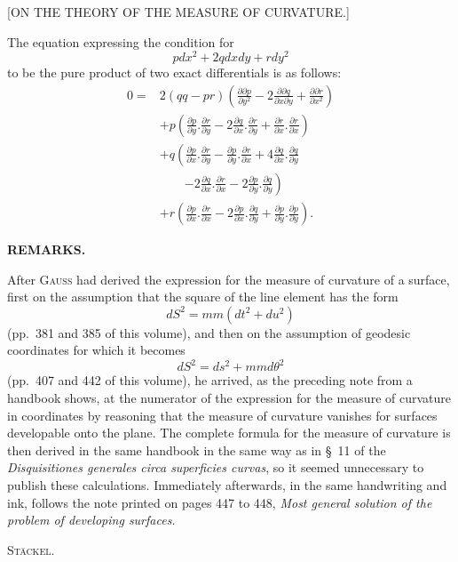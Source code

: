 \clearpage
{}
\begin{center}\large [ON THE THEORY OF THE MEASURE OF CURVATURE.]\end{center}
\noindent\hspace*{1.2em}The equation expressing the condition for
\[
pdx^2+2qdxdy+rdy^2
\]
\noindent to be the pure product of two exact differentials is as follows:
\[
\begin{aligned}
0={}&2(qq-pr)\left(\frac{\partial\partial p}{\partial y^2}
-2\frac{\partial\partial q}{\partial x\partial y}
+\frac{\partial\partial r}{\partial x^2}\right)\\
&+p\left(\frac{\partial p}{\partial y}.\frac{\partial r}{\partial y}
-2\frac{\partial q}{\partial x}.\frac{\partial r}{\partial y}
+\frac{\partial r}{\partial x}.\frac{\partial r}{\partial x}\right)\\
&+q\left(\frac{\partial p}{\partial x}.\frac{\partial r}{\partial y}
-\frac{\partial p}{\partial y}.\frac{\partial r}{\partial x}
+4\frac{\partial q}{\partial x}.\frac{\partial q}{\partial y}\right.\\
&\qquad\left.-2\frac{\partial q}{\partial x}.\frac{\partial r}{\partial x}
-2\frac{\partial p}{\partial y}.\frac{\partial q}{\partial y}\right)\\
&+r\left(\frac{\partial p}{\partial x}.\frac{\partial r}{\partial x}
-2\frac{\partial p}{\partial x}.\frac{\partial q}{\partial y}
+\frac{\partial p}{\partial y}.\frac{\partial p}{\partial y}\right).
\end{aligned}
\]

\begin{center}\textbf{REMARKS.}\end{center}
\noindent\hspace*{1.2em}After \textsc{Gauss} had derived the expression for the measure of curvature of a surface, first on the assumption that the square of the line element has the form
\[
dS^2=mm(dt^2+du^2)
\]
\noindent (pp.\ 381 and 385 of this volume), and then on the assumption of geodesic coordinates for which it becomes
\[
dS^2=ds^2+mmd\theta^2
\]
\noindent (pp.\ 407 and 442 of this volume), he arrived, as the preceding note from a handbook shows, at the numerator of the expression for the measure of curvature in  coordinates by reasoning that the measure of curvature vanishes for surfaces developable onto the plane. The complete formula for the measure of curvature is then derived in the same handbook in the same way as in \S\ 11 of the \textit{Disquisitiones generales circa superficies curvas}, so it seemed unnecessary to publish these calculations. Immediately afterwards, in the same handwriting and ink, follows the note printed on pages 447 to 448, \textit{Most general solution of the problem of developing surfaces.}
\begin{flushright}\textsc{Stäckel}.\end{flushright}


